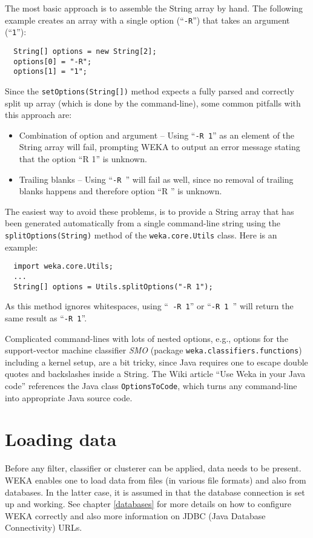 The most basic approach is to assemble the String array by hand. The following
example creates an array with a single option (``\texttt{-R}'') that takes an
argument (``\texttt{1}''):
\begin{verbatim}
  String[] options = new String[2];
  options[0] = "-R";
  options[1] = "1";
\end{verbatim}
Since the \texttt{setOptions(String[])} method expects a fully parsed and
correctly split up array (which is done by the command-line), some common
pitfalls with this approach are:
\begin{itemize}
	\item Combination of option and argument -- Using ``\texttt{-R 1}'' as an
element of the String array will fail, prompting WEKA to output an error message
stating that the option ``R 1'' is unknown.
	\item Trailing blanks -- Using ``\texttt{-R }'' will fail as well, since no
removal of trailing blanks happens and therefore option ``R '' is unknown.
\end{itemize}
The easiest way to avoid these problems, is to provide a String array that has
been generated automatically from a single command-line string using the
\texttt{splitOptions(String)} method of the \texttt{weka.core.Utils} class.
Here is an example:
\begin{verbatim}
  import weka.core.Utils;
  ...
  String[] options = Utils.splitOptions("-R 1");
\end{verbatim}
As this method ignores whitespaces, using ``\texttt{  -R    1}'' or
``\texttt{-R 1 }'' will return the same result as ``\texttt{-R 1}''.

Complicated command-lines with lots of nested options, e.g., options for the
support-vector machine classifier \textit{SMO} (package
\texttt{weka.classifiers.functions}) including a kernel setup, are a bit tricky,
since Java requires one to escape double quotes and backslashes inside a
String. The Wiki\cite{wekawiki} article ``Use Weka in your Java code''
references the Java class \texttt{OptionsToCode}, which turns any command-line
into appropriate Java source code.

\newpage

\section{Loading data}
Before any filter, classifier or clusterer can be applied, data needs to be
present. WEKA enables one to load data from files (in various file formats) and
also from databases. In the latter case, it is assumed in that the database
connection is set up and working. See chapter \ref{databases} for more details
on how to configure WEKA correctly and also more information on JDBC (Java
Database Connectivity) URLs.

